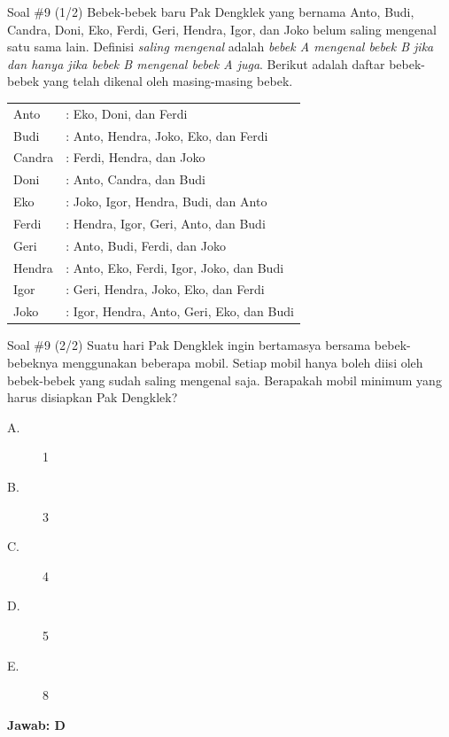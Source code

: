 \documentclass[english,t]{beamer}
\begin{document}
	\begin{frame}{Soal \#9 (1/2)}
		Bebek-bebek baru Pak Dengklek yang bernama Anto, Budi, Candra, Doni, Eko, Ferdi, Geri, Hendra, Igor, dan Joko belum saling mengenal satu sama lain. Definisi \textit{saling mengenal} adalah \textit{bebek A mengenal bebek B jika dan hanya jika bebek B mengenal bebek A juga}. Berikut adalah daftar bebek-bebek yang telah dikenal oleh masing-masing bebek.
		
		\bigskip
		\begin{tabular}{ll}
			Anto      &: Eko, Doni, dan Ferdi \\
			Budi      &: Anto, Hendra, Joko, Eko, dan Ferdi \\
			Candra    &: Ferdi, Hendra, dan Joko \\
			Doni      &: Anto, Candra, dan Budi \\
			Eko       &: Joko, Igor, Hendra, Budi, dan Anto \\
			Ferdi     &: Hendra, Igor, Geri, Anto, dan Budi \\
			Geri      &: Anto, Budi, Ferdi, dan Joko \\
			Hendra    &: Anto, Eko, Ferdi, Igor, Joko, dan Budi \\
			Igor      &: Geri, Hendra, Joko, Eko, dan Ferdi \\
			Joko      &: Igor, Hendra, Anto, Geri, Eko, dan Budi
		\end{tabular} 
	\end{frame}


	\begin{frame}{Soal \#9 (2/2)}
		Suatu hari Pak Dengklek ingin bertamasya bersama bebek-bebeknya menggunakan beberapa mobil. Setiap mobil hanya boleh diisi oleh bebek-bebek yang sudah saling mengenal saja. Berapakah mobil minimum yang harus disiapkan Pak Dengklek?
		\begin{description}
			\item[A.] 1
			\item[B.] 3
			\item[C.] 4
			\item[D.] 5
			\item[E.] 8
		\end{description}		
		\pause \textbf{Jawab: D}	
	\end{frame}
\end{document}
